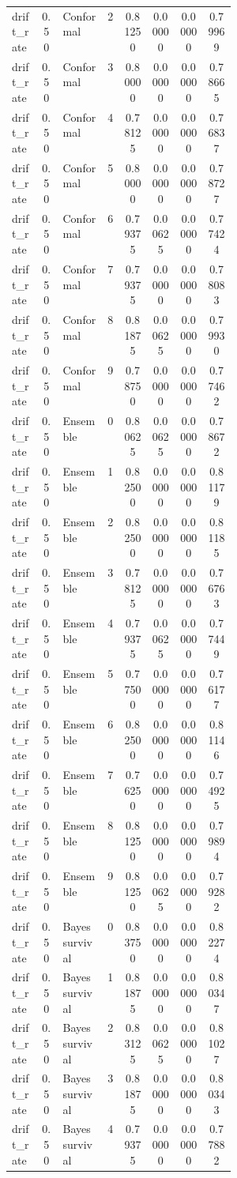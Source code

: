 \documentclass{article}
\begin{document}
\begin{center}
\begin{longtable}{p{0.13\linewidth}cp{0.20\linewidth}ccccc}
drift\_rate & 0.50 & Conformal & 2 & 0.81250 & 0.00000 & 0.00000 & 0.79969\\
drift\_rate & 0.50 & Conformal & 3 & 0.80000 & 0.00000 & 0.00000 & 0.78665\\
drift\_rate & 0.50 & Conformal & 4 & 0.78125 & 0.00000 & 0.00000 & 0.76837\\
drift\_rate & 0.50 & Conformal & 5 & 0.80000 & 0.00000 & 0.00000 & 0.78727\\
drift\_rate & 0.50 & Conformal & 6 & 0.79375 & 0.00625 & 0.00000 & 0.77424\\
drift\_rate & 0.50 & Conformal & 7 & 0.79375 & 0.00000 & 0.00000 & 0.78083\\
drift\_rate & 0.50 & Conformal & 8 & 0.81875 & 0.00625 & 0.00000 & 0.79930\\
drift\_rate & 0.50 & Conformal & 9 & 0.78750 & 0.00000 & 0.00000 & 0.77462\\
drift\_rate & 0.50 & Ensemble & 0 & 0.80625 & 0.00625 & 0.00000 & 0.78672\\
drift\_rate & 0.50 & Ensemble & 1 & 0.82500 & 0.00000 & 0.00000 & 0.81179\\
drift\_rate & 0.50 & Ensemble & 2 & 0.82500 & 0.00000 & 0.00000 & 0.81185\\
drift\_rate & 0.50 & Ensemble & 3 & 0.78125 & 0.00000 & 0.00000 & 0.76763\\
drift\_rate & 0.50 & Ensemble & 4 & 0.79375 & 0.00625 & 0.00000 & 0.77449\\
drift\_rate & 0.50 & Ensemble & 5 & 0.77500 & 0.00000 & 0.00000 & 0.76177\\
drift\_rate & 0.50 & Ensemble & 6 & 0.82500 & 0.00000 & 0.00000 & 0.81146\\
drift\_rate & 0.50 & Ensemble & 7 & 0.76250 & 0.00000 & 0.00000 & 0.74925\\
drift\_rate & 0.50 & Ensemble & 8 & 0.81250 & 0.00000 & 0.00000 & 0.79894\\
drift\_rate & 0.50 & Ensemble & 9 & 0.81250 & 0.00625 & 0.00000 & 0.79282\\
drift\_rate & 0.50 & Bayes survival & 0 & 0.83750 & 0.00000 & 0.00000 & 0.82274\\
drift\_rate & 0.50 & Bayes survival & 1 & 0.81875 & 0.00000 & 0.00000 & 0.80347\\
drift\_rate & 0.50 & Bayes survival & 2 & 0.83125 & 0.00625 & 0.00000 & 0.81027\\
drift\_rate & 0.50 & Bayes survival & 3 & 0.81875 & 0.00000 & 0.00000 & 0.80343\\
drift\_rate & 0.50 & Bayes survival & 4 & 0.79375 & 0.00000 & 0.00000 & 0.77882\\

\end{longtable}
\end{center}
\end{document}
